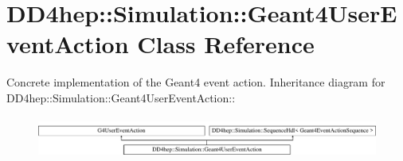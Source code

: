 \hypertarget{class_d_d4hep_1_1_simulation_1_1_geant4_user_event_action}{
\section{DD4hep::Simulation::Geant4UserEventAction Class Reference}
\label{class_d_d4hep_1_1_simulation_1_1_geant4_user_event_action}
}


Concrete implementation of the Geant4 event action.  
Inheritance diagram for DD4hep::Simulation::Geant4UserEventAction::\begin{figure}[H]
\begin{center}
\leavevmode
\includegraphics[height=1.40704cm]{class_d_d4hep_1_1_simulation_1_1_geant4_user_event_action}
\end{center}
\end{figure}
